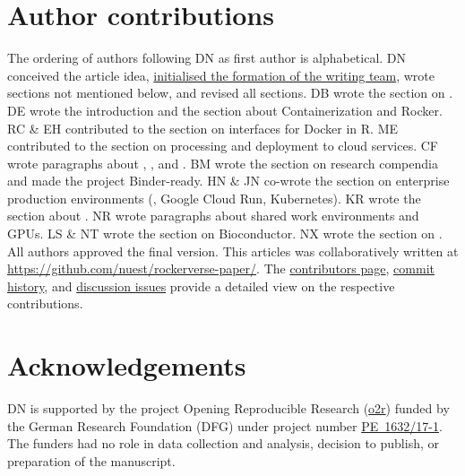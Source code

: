 \hypertarget{author-contributions}{%
\section{Author contributions}\label{author-contributions}}

The ordering of authors following DN as first author is alphabetical. DN
conceived the article idea,
\href{https://github.com/nuest/rockerverse-paper/issues/3}{initialised the formation of the writing team},
wrote sections not mentioned below, and revised all sections. DB wrote
the section on . DE wrote the introduction and the section
about Containerization and Rocker. RC \& EH contributed to the section
on interfaces for Docker in R. ME contributed to the section on
processing and deployment to cloud services. CF wrote paragraphs about
, ,  and . BM wrote
the section on research compendia and made the project Binder-ready. HN
\& JN co-wrote the section on enterprise production environments
(, Google Cloud Run, Kubernetes). KR wrote the
section about . NR wrote paragraphs about shared work
environments and GPUs. LS \& NT wrote the section on Bioconductor. NX
wrote the section on . All authors approved the final
version. This articles was collaboratively written at
\href{https://github.com/nuest/rockerverse-paper/}{https://github.com/nuest/rockerverse-paper/}.
The
\href{https://github.com/nuest/rockerverse-paper/graphs/contributors}{contributors page},
\href{https://github.com/nuest/rockerverse-paper/commits/master}{commit history},
and
\href{https://github.com/nuest/rockerverse-paper/issues/}{discussion issues}
provide a detailed view on the respective contributions.

\hypertarget{acknowledgements}{%
\section{Acknowledgements}\label{acknowledgements}}

DN is supported by the project Opening Reproducible Research
(\href{https://www.uni-muenster.de/forschungaz/project/12343}{o2r})
funded by the German Research Foundation (DFG) under project number
\href{https://gepris.dfg.de/gepris/projekt/415851837}{PE~1632/17-1}. The
funders had no role in data collection and analysis, decision to
publish, or preparation of the manuscript.





